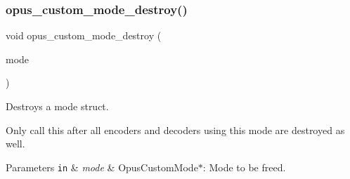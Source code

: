 \subsubsection{\texorpdfstring{opus\+\_\+custom\+\_\+mode\+\_\+destroy()}{opus\_custom\_mode\_destroy()}}
{\footnotesize\ttfamily void opus\+\_\+custom\+\_\+mode\+\_\+destroy (\begin{DoxyParamCaption}\item[{\hyperlink{group__opus__custom_gaf33847c711195b9edef896b73c96ec4f}{Opus\+Custom\+Mode} $\ast$}]{mode }\end{DoxyParamCaption})}



Destroys a mode struct. 

Only call this after all encoders and decoders using this mode are destroyed as well. 
\begin{DoxyParams}[1]{Parameters}
\mbox{\tt in}  & {\em mode} & {\ttfamily Opus\+Custom\+Mode$\ast$}\+: Mode to be freed. \\
\hline
\end{DoxyParams}
